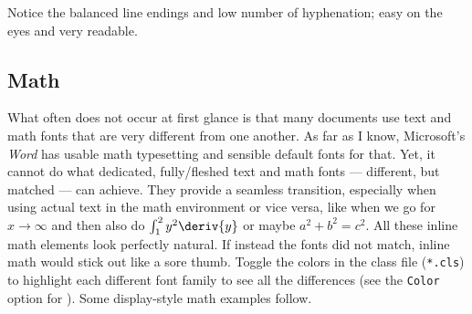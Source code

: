 Notice the balanced line endings and low number of hyphenation;
easy on the eyes and very readable.

\subsection{Math}

What often does not occur at first glance is that many documents use text and math fonts
that are very different from one another.
As far as I know, Microsoft's \emph{Word} has usable math typesetting and sensible default
fonts for that.
Yet, it cannot do what dedicated, fully\-/fleshed text and math fonts
--- different, but matched ---
can achieve.
They provide a seamless transition, especially when using actual text in the math
environment or vice versa, like when we go for \(x \to \infty\) and then also do
\(\int_{1}^{2} y^2 \deriv{y}\) or maybe \(a^2 + b^2 = c^2\).
All these inline math elements look perfectly natural.
If instead the fonts did not match, inline math would stick out like a sore thumb.
Toggle the colors in the class file (\texttt{*.cls}) to highlight each different
font family to see all the differences (see the \verb|Color| option for
).
Some display-style math examples follow.
